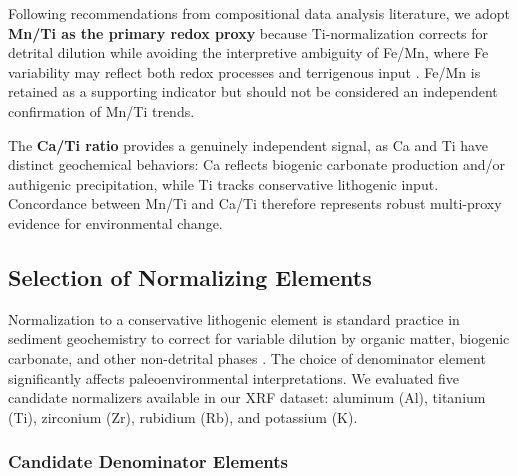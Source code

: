 Following recommendations from compositional data analysis literature, we adopt \textbf{Mn/Ti as the primary redox proxy} because Ti-normalization corrects for detrital dilution while avoiding the interpretive ambiguity of Fe/Mn, where Fe variability may reflect both redox processes and terrigenous input \citep{Naher2013, Makri2020}. Fe/Mn is retained as a supporting indicator but should not be considered an independent confirmation of Mn/Ti trends.

The \textbf{Ca/Ti ratio} provides a genuinely independent signal, as Ca and Ti have distinct geochemical behaviors: Ca reflects biogenic carbonate production and/or authigenic precipitation, while Ti tracks conservative lithogenic input. Concordance between Mn/Ti and Ca/Ti therefore represents robust multi-proxy evidence for environmental change.

\subsection{Selection of Normalizing Elements}

Normalization to a conservative lithogenic element is standard practice in sediment geochemistry to correct for variable dilution by organic matter, biogenic carbonate, and other non-detrital phases \citep{Loring1991}. The choice of denominator element significantly affects paleoenvironmental interpretations. We evaluated five candidate normalizers available in our XRF dataset: aluminum (Al), titanium (Ti), zirconium (Zr), rubidium (Rb), and potassium (K).

\subsubsection{Candidate Denominator Elements}

